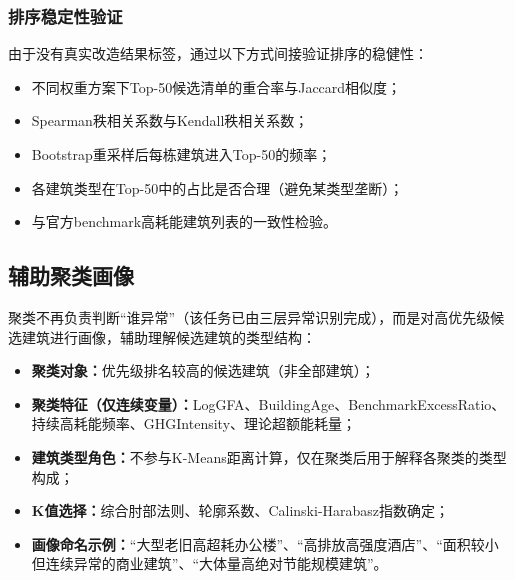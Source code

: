 \subsubsection{排序稳定性验证}

由于没有真实改造结果标签，通过以下方式间接验证排序的稳健性：
\begin{itemize}
    \item 不同权重方案下Top-50候选清单的重合率与Jaccard相似度；
    \item Spearman秩相关系数与Kendall秩相关系数；
    \item Bootstrap重采样后每栋建筑进入Top-50的频率；
    \item 各建筑类型在Top-50中的占比是否合理（避免某类型垄断）；
    \item 与官方benchmark高耗能建筑列表的一致性检验。
\end{itemize}

\subsection{辅助聚类画像}

聚类不再负责判断``谁异常''（该任务已由三层异常识别完成），而是对高优先级候选建筑进行画像，辅助理解候选建筑的类型结构：

\begin{itemize}
    \item \textbf{聚类对象：}优先级排名较高的候选建筑（非全部建筑）；
    \item \textbf{聚类特征（仅连续变量）：}LogGFA、BuildingAge、BenchmarkExcessRatio、持续高耗能频率、GHGIntensity、理论超额能耗量；
    \item \textbf{建筑类型角色：}不参与K-Means距离计算，仅在聚类后用于解释各聚类的类型构成；
    \item \textbf{K值选择：}综合肘部法则、轮廓系数、Calinski-Harabasz指数确定；
    \item \textbf{画像命名示例：}``大型老旧高超耗办公楼''、``高排放高强度酒店''、``面积较小但连续异常的商业建筑''、``大体量高绝对节能规模建筑''。
\end{itemize}
